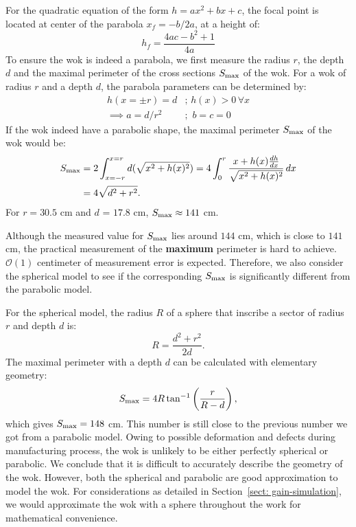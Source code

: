 \documentclass[12pt]{article}
\begin{document}
    For the quadratic equation of the form $h = ax^2 + bx + c$, the focal point is located at center of the parabola $x_f=-b/2a$, at a height of:
    \begin{equation} \label{eq: focal-parabola}
        h_f = \frac{4ac-b^2 + 1}{4a}
    \end{equation}
    To ensure the wok is indeed a parabola, we first measure the radius $r$, the depth $d$ and the maximal perimeter of the cross sections $S_{\rm max}$ of the wok.
    For a wok of radius $r$ and a depth $d$, the parabola parameters can be determined by:
    \begin{align}
        h(x= \pm r) = d &; \, h(x) > 0 \, \forall x \\
        \implies a = d/r^2 &; \,\, b=c=0 
    \end{align}
    If the wok indeed have a parabolic shape, the maximal perimeter $S_{\rm max}$ of the wok would be:
    \begin{equation}
    \begin{split}
        S_{\rm max} &= 2\int^{x=r}_{x=-r} d( \sqrt{x^2+h(x)^2} ) = 4\int^{r}_{0} \frac{x + h(x)\frac{dh}{dx} }{\sqrt{x^2+h(x)^2}} \, dx \\
        &= 4\sqrt{d^2+r^2}.
    \end{split} 
    \end{equation}
    For $r=30.5$ cm and $d$ = $17.8$ cm, $S_{\rm max} \approx 141 $ cm.
    
    Although the measured value for $S_{\rm max}$ lies around $144$ cm, which is close to $141$ cm, the practical measurement of the \textbf{maximum} perimeter is hard to achieve. $\mathcal{O}(1)$ centimeter of measurement error is expected. 
    Therefore, we also consider the spherical model to see if the corresponding $S_{\rm max}$ is significantly different from the parabolic model.
    
    For the spherical model, the radius $R$ of a sphere that inscribe a sector of radius $r$ and depth $d$ is:
    \begin{equation}
        R = \frac{d^2 + r^2}{2d}.
    \end{equation}
    The maximal perimeter with a depth $d$ can be calculated with elementary geometry:
    \begin{equation}
        S_{\rm max} = 4R \tan^{-1}\left( \frac{r}{R-d} \right),
    \end{equation}
    which gives $S_{\rm max} = 148$ cm.
    This number is still close to the previous number we got from a parabolic model. 
    Owing to possible deformation and defects during manufacturing process, the wok is unlikely to be either perfectly spherical or parabolic.
    We conclude that it is difficult to accurately describe the geometry of the wok.
    However, both the spherical and parabolic are good approximation to model the wok. 
    For considerations as detailed in Section~\ref{sect: gain-simulation}, we would approximate the wok with a sphere throughout the work for mathematical convenience.
    
    \raggedright
	
	
\end{document}
